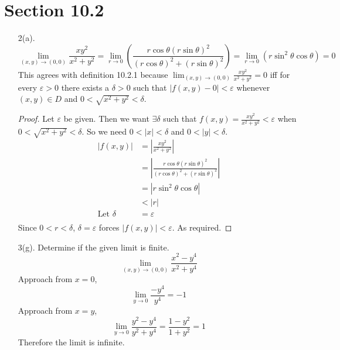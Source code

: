 \documentclass[hidelinks,12pt]{article}
\title{\scalebox{2}{Math 524 Homework 5}}
\author{\scalebox{1.5}{Theo Koss}}
\date{May 2024}
\begin{document}
\maketitle
\section{Section 10.2}
\begin{enumerate}
    \item[2(a).] \[\lim_{(x,y)\to(0,0)}\frac{xy^2}{x^2+y^2}=\lim_{r\to0}(\frac{r\cos{\theta}(r\sin{\theta})^2}{(r\cos\theta)^2+(r\sin\theta)^2})=\lim_{r\to0}(r\sin^2\theta\cos\theta)=0\]
        This agrees with definition 10.2.1 because $\lim_{(x,y)\to(0,0)}\frac{xy^2}{x^2+y^2}=0$ iff for every $\varepsilon>0$ there exists a $\delta>0$ such that $|f(x,y)-0|<\varepsilon$ whenever $(x,y)\in D$ and $0<\sqrt{x^2+y^2}<\delta$.\begin{proof}
            Let $\varepsilon$ be given. Then we want $\exists\delta$ such that $f(x,y)=\frac{xy^2}{x^2+y^2}<\varepsilon$ when $0<\sqrt{x^2+y^2}<\delta$. So we need $0<|x|<\delta$ and $0<|y|<\delta$. \begin{align*}
                |f(x,y)|&=|\frac{xy^2}{x^2+y^2}|\\
                        &=|\frac{r\cos{\theta}(r\sin{\theta})^2}{(r\cos\theta)^2+(r\sin\theta)^2}|\\
                        &=|r\sin^2\theta\cos\theta|\\
                        &< |r|\\
                \text{Let }\delta&=\varepsilon\\
            \end{align*}
            Since $0<r<\delta$, $\delta=\varepsilon$ forces $|f(x,y)|<\varepsilon$. As required.
        \end{proof}
    \item[3(g).] Determine if the given limit is finite.
        \[\lim_{(x,y)\to(0,0)}\frac{x^2-y^4}{x^2+y^4}\]
        Approach from $x=0$, 
        \[\lim_{y\to0}\frac{-y^4}{y^4}=-1\]
        Approach from $x=y$,
        \[\lim_{y\to0}\frac{y^2-y^4}{y^2+y^4}=\frac{1-y^2}{1+y^2}=1\]
        Therefore the limit is infinite.
\end{enumerate}
\end{document}
